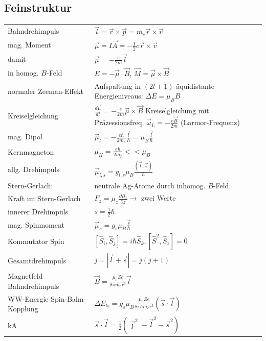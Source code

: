 \documentclass[12pt,a4paper]{article}
\newcommand{\abs}[1]{\left| #1 \right|}
\renewcommand{\d}[2]{\frac{d #1}{d #2}}
\newcommand{\pd}[2]{\frac{\partial #1}{\partial #2}}
\renewcommand{\=}[1]{\stackrel{#1}{=}}
\newcommand{\ort}{\vec r}
\theoremstyle{definition}
\theoremstyle{remark}
\begin{document}
\subsection{Feinstruktur}

\begin{center}
\begin{minipage}[t]{.35\linewidth}
\vspace{0pt}
\noindent\begin{tabular}{ll}
\toprule
Bahndrehimpuls &  $\vec l = \ort \times \vec p = m_e \ort \times \vec v$\\
mag. Moment &  $\vec \mu = I \vec A = - \frac{1}{2} e \ort \times \vec v$\\
damit &  $\vec \mu = - \frac{e}{2m} \vec l$\\
in homog. $B$-Feld &  $E = - \vec \mu \cdot \vec B$, $\vec M = \vec \mu \times \vec B$\\
normaler Zeeman-Effekt &  Aufspaltung in $(2l+1)$ äquidistante Energieniveaus: $\Delta E = \mu_B B$\\
Kreiselgleichung & $\d{\vec \mu}{t} = - \frac{e}{2m} \vec \mu \times \vec B$ Kreiselgleichung mit Präzessionsfreq. $\vec \omega_L = - \frac{e \vec B}{2m}$ (Larmor-Frequenz)\\
mag. Dipol & $\vec \mu_l = - \frac{e \hbar}{2m_e} \frac{\vec l}{\hbar} = \mu_B \frac{\vec l}{\hbar}$\\
Kernmagneton & $\mu_K = \frac{e \hbar}{2m_p} << \mu_B$\\
allg. Drehimpuls &  $\vec \mu_{l,s} = g_{l,s} \mu_B \frac{(\vec l, \vec s)}{\hbar}$\\
Stern-Gerlach: & neutrale Ag-Atome durch inhomog. $B$-Feld\\
Kraft im Stern-Gerlach & $F_z = \mu_z \pd{B_z}{z} \rightarrow$ zwei Werte\\
innerer Drehimpuls &  $s = \frac{1}{2} \hbar$\\
mag. Spinmoment &  $\vec \mu_s = g_s \mu_B \frac{\vec s}{\hbar}$\\
Kommutator Spin & $[\hat S_i, \hat S_j] = i\hbar \hat S_k, [\hat S^2, \hat S_z] = 0$\\
Gesamtdrehimpuls &  $j = \abs{\vec l + \vec s} = j(j+1)$\\
Magnetfeld Bahndrehimpuls &  $\vec B = \frac{\mu_0 Z e}{8\pi m_e r^3} \vec l$\\
WW-Energie Spin-Bahn-Kopplung &  $\Delta E_{ls} = g_s \mu_B \frac{\mu_0 Z e}{8 \pi \hbar m_e r^3} (\vec s \cdot \vec l)$\\
kA & $\vec s \cdot \vec l = \frac{1}{2} (\vec \jmath^2 - \vec l^2 - \vec s^2)$\\

\end{tabular}
\end{minipage}
\end{center}
\end{document}
